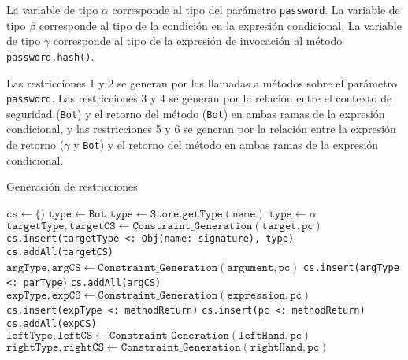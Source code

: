La variable de tipo $\alpha$ corresponde al tipo del parámetro \texttt{password}. La variable de tipo $\beta$ corresponde al tipo de la condición en la expresión condicional. La variable de tipo $\gamma$ corresponde al tipo de la expresión de invocación al método \texttt{password.hash()}.

Las restricciones 1 y 2 se generan por las llamadas a métodos sobre el parámetro \texttt{password}. Las restricciones 3 y 4 se generan por la relación entre el contexto de seguridad (\texttt{Bot}) y el retorno del método (\texttt{Bot}) en ambas ramas de la expresión condicional, y las restricciones 5 y 6 se generan por la relación entre la expresión de retorno ($\gamma$ y \texttt{Bot}) y el retorno del método en ambas ramas de la expresión condicional.
\clearpage
\begin{algorithm}\captionsetup{labelsep=newline}
  \centering
  \caption{Generación de restricciones}
  \label{pseudogen}
    \begin{algorithmic}[1]
          \State $\mathtt{cs\gets \{)}$
          \State $\mathtt{type\gets Bot}$
              \State $\mathtt{type\gets Store.getType(name)}$
            \EndCase
              \State $\mathtt{type\gets \alpha}$ \label{lineTVar}
              \State $\mathtt{targetType, targetCS\gets Constraint\_Generation(target, pc)}$ \label{lineAss}
              \State \texttt{cs.insert(targetType <: Obj(name: signature), type)}
              \State \texttt{cs.addAll(targetCS)}
                \State $\mathtt{argType, argCS\gets Constraint\_Generation(argument, pc)}$
                \State \texttt{cs.insert(argType <: parType})
                \State \texttt{cs.addAll(argCS)}
              \EndFor
            \EndCase
              \State $\mathtt{expType, expCS\gets Constraint\_Generation(expression, pc)}$
              \State \texttt{cs.insert(expType <: methodReturn)}
              \State \texttt{cs.insert(pc <: methodReturn)}
              \State \texttt{cs.addAll(expCS)}
            \EndCase
              \State $\mathtt{leftType, leftCS\gets Constraint\_Generation(leftHand, pc)}$
              \State $\mathtt{rightType, rightCS\gets Constraint\_Generation(rightHand, pc)}$

\end{algorithmic}
\end{algorithm}
